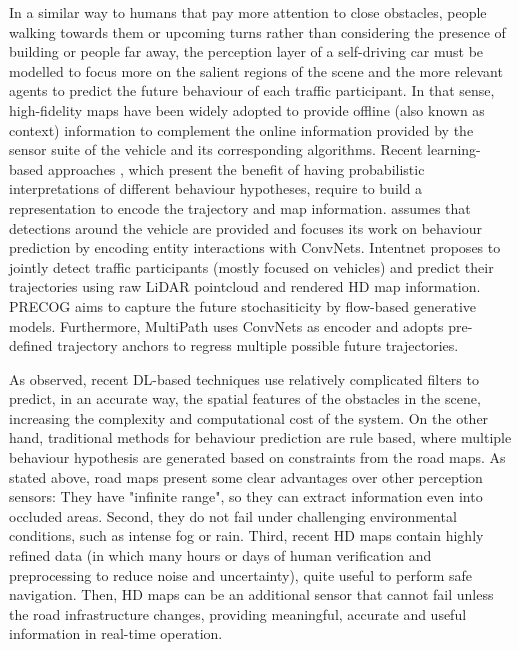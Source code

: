 In a similar way to humans that pay more attention to close obstacles, people walking towards them or upcoming turns rather than considering the presence of building or people far away, the perception layer of a self-driving car must be modelled to focus more on the salient regions of the scene \cite{sadeghian2019sophie} and the more relevant agents to predict the future behaviour of each traffic participant. In that sense, high-fidelity maps have been widely adopted to provide offline (also known as context) information to complement the online information provided by the sensor suite of the vehicle and its corresponding algorithms. Recent learning-based approaches \cite{hong2019rules} \cite{chai2019multipath} \cite{gao2020vectornet} \cite{casas2018intentnet}, which present the benefit of having probabilistic interpretations of different behaviour hypotheses, require to build a representation to encode the trajectory and map information. \cite{hong2019rules} assumes that detections around the vehicle are provided and focuses its work on behaviour prediction by encoding entity interactions with ConvNets. Intentnet \cite{casas2018intentnet} proposes to jointly detect traffic participants (mostly focused on vehicles) and predict their trajectories using raw LiDAR pointcloud and rendered HD map information. PRECOG \cite{rhinehart2019precog} aims to capture the future stochasiticity by flow-based generative models. Furthermore, MultiPath \cite{chai2019multipath} uses ConvNets as encoder and adopts pre-defined trajectory anchors to regress multiple possible future trajectories. 

As observed, recent \ac{DL}-based techniques use relatively complicated filters to predict, in an accurate way, the spatial features of the obstacles in the scene, increasing the complexity and computational cost of the system. On the other hand, traditional methods for behaviour prediction are rule based, where multiple behaviour hypothesis are generated based on constraints from the road maps. As stated above, road maps present some clear advantages over other perception sensors: They have "infinite range", so they can extract information even into occluded areas. Second, they do not fail under challenging environmental conditions, such as intense fog or rain. Third, recent HD maps contain highly refined data (in which many hours or days of human verification and preprocessing to reduce noise and uncertainty), quite useful to perform safe navigation. Then, HD maps can be an additional sensor that cannot fail unless the road infrastructure changes, providing meaningful, accurate and useful information in real-time operation.  

